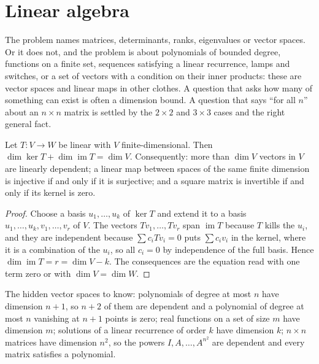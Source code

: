 \section{Linear algebra}

\begin{recognise}
The problem names matrices, determinants, ranks, eigenvalues or vector spaces. Or it does not, and the problem is about polynomials of bounded degree, functions on a finite set, sequences satisfying a linear recurrence, lamps and switches, or a set of vectors with a condition on their inner products: these are vector spaces and linear maps in other clothes. A question that asks how many of something can exist is often a dimension bound. A question that says ``for all $n$'' about an $n\times n$ matrix is settled by the $2\times2$ and $3\times3$ cases and the right general fact.
\end{recognise}

\begin{theorem}
Let $T\colon V\to W$ be linear with $V$ finite-dimensional. Then $\dim\ker T+\dim\operatorname{im}T=\dim V$. Consequently: more than $\dim V$ vectors in $V$ are linearly dependent; a linear map between spaces of the same finite dimension is injective if and only if it is surjective; and a square matrix is invertible if and only if its kernel is zero.
\end{theorem}

\begin{proof}
Choose a basis $u_1,\dots,u_k$ of $\ker T$ and extend it to a basis $u_1,\dots,u_k,v_1,\dots,v_r$ of $V$. The vectors $Tv_1,\dots,Tv_r$ span $\operatorname{im}T$ because $T$ kills the $u_i$, and they are independent because $\sum c_iTv_i=0$ puts $\sum c_iv_i$ in the kernel, where it is a combination of the $u_i$, so all $c_i=0$ by independence of the full basis. Hence $\dim\operatorname{im}T=r=\dim V-k$. The consequences are the equation read with one term zero or with $\dim V=\dim W$.
\end{proof}

The hidden vector spaces to know: polynomials of degree at most $n$ have dimension $n+1$, so $n+2$ of them are dependent and a polynomial of degree at most $n$ vanishing at $n+1$ points is zero; real functions on a set of size $m$ have dimension $m$; solutions of a linear recurrence of order $k$ have dimension $k$; $n\times n$ matrices have dimension $n^2$, so the powers $I,A,\dots,A^{n^2}$ are dependent and every matrix satisfies a polynomial.

